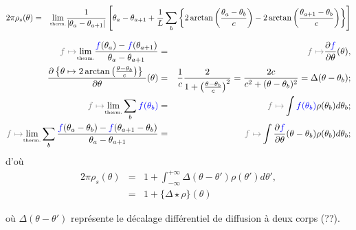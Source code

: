 {\tiny 
\begin{eqnarray}
	2\pi \rho_s ( \theta ) & = & \underset{\tiny \mbox{therm.}}{\lim} \frac{1}{ \vert \theta_a - \theta_{a+1} \vert } \left [ \theta_a - \theta_{a+1} + \frac{1}{L} \sum_{b }  \left \{2 \arctan \left( \frac{\theta_a - \theta_b }{c} \right )  - 2 \arctan \left( \frac{\theta_{a+1} - \theta_b }{c} \right )\right \}   \right ] 		
\end{eqnarray}
}

\begin{eqnarray*}
	{\color{gray} f \mapsto } \underset{\tiny \mbox{therm.}}{\lim}  \frac{{\color{blue} f}(\theta_{a}) - {\color{blue} f}(\theta_{a+1})}{\theta_{a} - \theta_{a+1 }}&  = & {\color{gray} f \mapsto } \frac{\partial {\color{blue} f} }{ \partial \theta } ( \theta), \\
	\frac{\partial \left \{  \theta \mapsto 2 \arctan \left ( \frac{ \theta - \theta_b}{ c}  \right ) \right \} }{ \partial \theta } ( \theta )     & = &  \frac{1}{c} \frac{2}{ 1 + \left( \frac{ \theta - \theta_b}{ c} \right )^2 } = \frac{ 2 c }{ c^2 + ( \theta - \theta_b)^2 } = \Delta ( \theta - \theta_b ) ;\\ 
	{\color{gray} f \mapsto }\underset{\tiny \mbox{therm.}}{\lim} \sum_{b} {\color{blue} f(\theta_b)} & = &  {\color{gray} f \mapsto}  \int {\color{blue} f(\theta_b)}  \rho(\theta_b ) d \theta_b ; \\ 
	{\color{gray} f \mapsto }\underset{\tiny \mbox{therm.}}{\lim} \sum_{b}  \frac{{\color{blue}f}(\theta_{a} - \theta_{b}) - {\color{blue}f}(\theta_{a+1}  - \theta_{b})}{\theta_{a} - \theta_{a+1 }} & = &  {\color{gray}   f \mapsto}  \int  \frac{\partial {\color{blue}f}}{\partial \theta } ( \theta - \theta_b)  \rho(\theta_b ) d \theta_b ;    	
\end{eqnarray*}
d'où
\begin{eqnarray}\label{eq:therm.rho_s_2}
	2\pi \rho_s ( \theta ) & = & 1 + \int_{ - \infty} ^{ + \infty } \Delta ( \theta - \theta' ) \rho ( \theta' ) d \theta' , \\
	& = & 1 + \{ \Delta \star \rho \} (\theta) 	 		
\end{eqnarray}

où $\Delta ( \theta - \theta' )$ représente le décalage différentiel de diffusion à deux corps (??).\\

